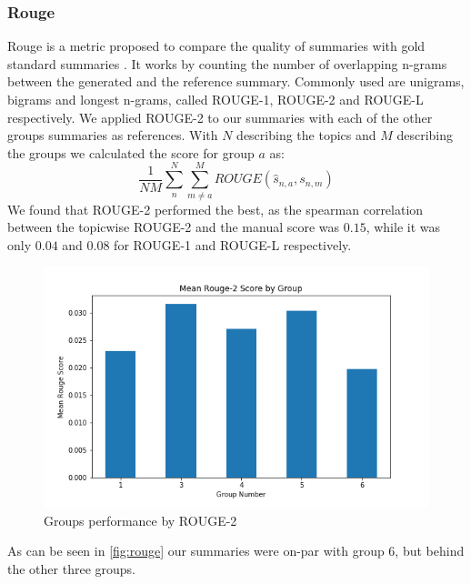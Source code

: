 \subsubsection{Rouge}
Rouge is a metric proposed to compare the quality of summaries with gold standard summaries \cite{lin2004rouge}. It works by counting the number of overlapping n-grams between the generated and the reference summary. Commonly used are unigrams, bigrams and longest n-grams, called ROUGE-1, ROUGE-2 and ROUGE-L respectively. We applied ROUGE-2 to our summaries with each of the other groups summaries as references. With $N$ describing the topics and $M$ describing the groups we calculated the score for group $a$ as:
$$\frac{1}{NM} \sum^N_{n} \sum^M_{m\neq a} ROUGE(\hat{s}_{n,a}, s_{n,m}) $$
We found that ROUGE-2 performed the best, as the spearman correlation between the topicwise ROUGE-2 and the manual score was $0.15$, while it was only $0.04$ and $0.08$ for ROUGE-1 and ROUGE-L respectively.

\begin{figure}[!ht]
	\centering
	\includegraphics[width=0.55\linewidth]{../evaluation/meanrouge.png}
	\caption{Groups performance by ROUGE-2}
	\label{fig:rouges}
\end{figure}

As can be seen in \ref{fig:rouge} our summaries were on-par with group 6, but behind the other three groups. 